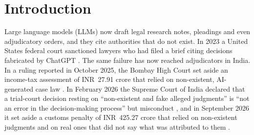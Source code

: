 \documentclass[conference]{IEEEtran}
\begin{document}
\section{Introduction}
Large language models (LLMs) now draft legal research notes, pleadings and even adjudicatory orders, and they cite authorities that do not exist. In 2023 a United States federal court sanctioned lawyers who had filed a brief citing decisions fabricated by ChatGPT \cite{mata}. The same failure has now reached adjudicators in India. In a ruling reported in October 2025, the Bombay High Court set aside an income-tax assessment of INR~27.91 crore that relied on non-existent, AI-generated case law \cite{kmgwires}. In February 2026 the Supreme Court of India declared that a trial-court decision resting on ``non-existent and fake alleged judgments'' is ``not an error in the decision-making process'' but misconduct \cite{gummadi}, and in September 2026 it set aside a customs penalty of INR~425.27 crore that relied on non-existent judgments and on real ones that did not say what was attributed to them \cite{gadiya}.
\end{document}
